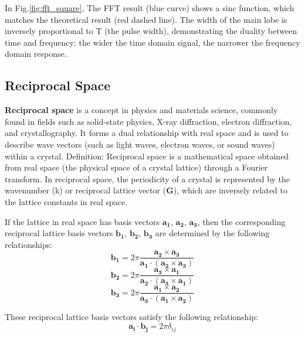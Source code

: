 \documentclass[12pt,a4paper]{article}
\begin{document}
\begin{CJK}{UTF8}{bkai}
In Fig.\ref{fig:fft_square}, The FFT result (blue curve) shows a sinc function, which matches the theoretical result (red dashed line).
The width of the main lobe is inversely proportional to T (the pulse width), demonstrating the duality between time and frequency: the wider the time domain signal, the narrower the frequency domain response.

\subsection{Reciprocal Space}
\hfill

\textbf{Reciprocal space} is a concept in physics and materials science, commonly found in fields such as solid-state physics, X-ray diffraction, electron diffraction, and crystallography. It forms a dual relationship with real space and is used to describe wave vectors (such as light waves, electron waves, or sound waves) within a crystal.
Definition:
Reciprocal space is a mathematical space obtained from real space (the physical space of a crystal lattice) through a Fourier transform. In reciprocal space, the periodicity of a crystal is represented by the wavenumber (k) or reciprocal lattice vector ($\mathbf{G}$), which are inversely related to the lattice constants in real space.

If the lattice in real space has basis vectors $\mathbf{a_1}$, $\mathbf{a_2}$, $\mathbf{a_3}$, then the corresponding reciprocal lattice basis vectors $\mathbf{b_1}$, $\mathbf{b_2}$, $\mathbf{b_3}$ are determined by the following relationships:
\begin{equation}
    \mathbf{b_1} = 2\pi \frac{\mathbf{a_2}\times \mathbf{a_3}}{\mathbf{a_1}\cdot(\mathbf{a_2}\times \mathbf{a_3})}
\end{equation}
\begin{equation}
    \mathbf{b_2} = 2\pi \frac{\mathbf{a_3}\times \mathbf{a_1}}{\mathbf{a_2}\cdot(\mathbf{a_3}\times \mathbf{a_1})}
\end{equation}
\begin{equation}
    \mathbf{b_3} = 2\pi \frac{\mathbf{a_1}\times \mathbf{a_2}}{\mathbf{a_3}\cdot(\mathbf{a_1}\times \mathbf{a_2})}
\end{equation}

These reciprocal lattice basis vectors satisfy the following relationship:
\begin{equation}
    \mathbf{a_i}\cdot\mathbf{b_j} = 2\pi\delta_{ij}
\end{equation}


\end{CJK}
\end{document}
